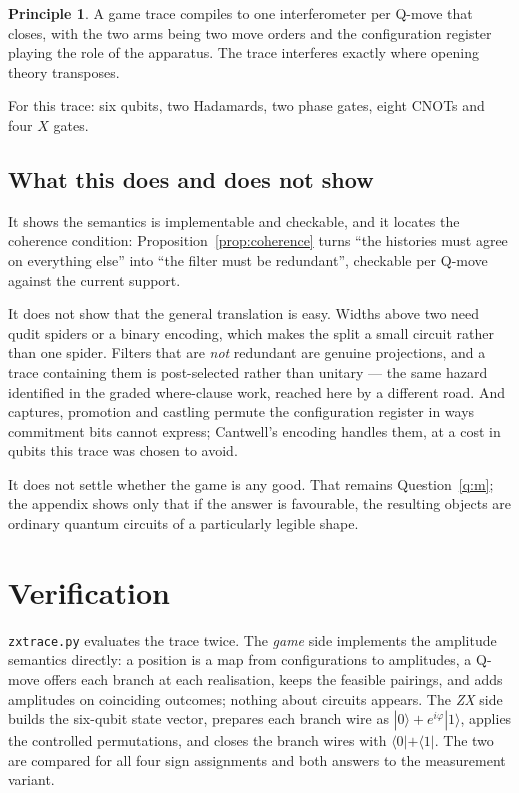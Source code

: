 \documentclass[11pt,a4paper]{article}
\theoremstyle{definition}
\newtheorem{principle}[definition]{Principle}
\theoremstyle{plain}
\begin{document}
\begin{principle}
A game trace compiles to one interferometer per Q-move that closes, with the two
arms being two move orders and the configuration register playing the role of
the apparatus. The trace interferes exactly where opening theory transposes.
\end{principle}

For this trace: six qubits, two Hadamards, two phase gates, eight CNOTs and four
$X$ gates.

\subsection{What this does and does not show}

It shows the semantics is implementable and checkable, and it locates the
coherence condition: Proposition~\ref{prop:coherence} turns ``the histories must
agree on everything else'' into ``the filter must be redundant'', checkable per
Q-move against the current support.

It does not show that the general translation is easy. Widths above two need
qudit spiders or a binary encoding, which makes the split a small circuit rather
than one spider. Filters that are \emph{not} redundant are genuine projections,
and a trace containing them is post-selected rather than unitary --- the same
hazard identified in the graded where-clause work, reached here by a different
road. And captures, promotion and castling permute the configuration register in
ways commitment bits cannot express; Cantwell's encoding handles them, at a cost
in qubits this trace was chosen to avoid.

It does not settle whether the game is any good. That remains
Question~\ref{q:m}; the appendix shows only that if the answer is favourable,
the resulting objects are ordinary quantum circuits of a particularly legible
shape.

\section{Verification}
\label{app:verif}

\texttt{zxtrace.py} evaluates the trace twice. The \emph{game} side implements
the amplitude semantics directly: a position is a map from configurations to
amplitudes, a Q-move offers each branch at each realisation, keeps the feasible
pairings, and adds amplitudes on coinciding outcomes; nothing about circuits
appears. The \emph{ZX} side builds the six-qubit state vector, prepares each
branch wire as $|0\rangle + e^{i\varphi}|1\rangle$, applies the controlled
permutations, and closes the branch wires with $\langle 0|+\langle 1|$. The two
are compared for all four sign assignments and both answers to the measurement
variant.
\end{document}
